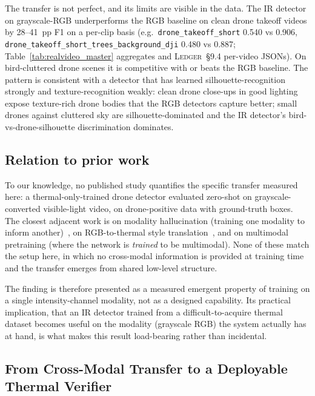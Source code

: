 \documentclass[12pt,a4paper,oneside,openright]{book}
\begin{document}
The transfer is not perfect, and its limits are visible in the data. The IR detector on grayscale-RGB underperforms the RGB baseline on clean drone takeoff videos by 28--41~pp F1 on a per-clip basis (e.g.\ \texttt{drone\_takeoff\_short} 0.540 vs 0.906, \texttt{drone\_takeoff\_short\_trees\_background\_dji} 0.480 vs 0.887; Table~\ref{tab:realvideo_master} aggregates and \textsc{Ledger}~\S9.4 per-video JSONs). On bird-cluttered drone scenes it is competitive with or beats the RGB baseline. The pattern is consistent with a detector that has learned silhouette-recognition strongly and texture-recognition weakly: clean drone close-ups in good lighting expose texture-rich drone bodies that the RGB detectors capture better; small drones against cluttered sky are silhouette-dominated and the IR detector's bird-vs-drone-silhouette discrimination dominates.

\subsection{Relation to prior work}

To our knowledge, no published study quantifies the specific transfer measured here: a thermal-only-trained drone detector evaluated zero-shot on grayscale-converted visible-light video, on drone-positive data with ground-truth boxes. The closest adjacent work is on modality hallucination (training one modality to inform another)~\cite{hoffman2016modalityhallucination}, on RGB-to-thermal style translation~\cite{berg2018rgb2thermal,kniaz2018thermalgan}, and on multimodal pretraining (where the network is \emph{trained} to be multimodal). None of these match the setup here, in which no cross-modal information is provided at training time and the transfer emerges from shared low-level structure.

The finding is therefore presented as a measured emergent property of training on a single intensity-channel modality, not as a designed capability. Its practical implication, that an IR detector trained from a difficult-to-acquire thermal dataset becomes useful on the modality (grayscale RGB) the system actually has at hand, is what makes this result load-bearing rather than incidental.

\subsection{From Cross-Modal Transfer to a Deployable Thermal Verifier}
\label{sec:grayscale_verifier}
\end{document}
